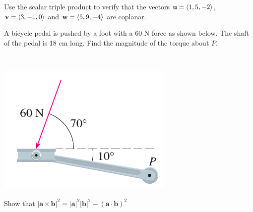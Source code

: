 \documentclass[notes]{subfiles}
\begin{document}
		\begin{ex}
			Use the scalar triple product to verify that the vectors $\textbf{u} = \left\langle 1,5,-2\right\rangle$, $\textbf{v} = \left\langle 3,-1,0\right\rangle$ and $\textbf{w} = \left\langle 5,9,-4\right\rangle$ are coplanar.
		\end{ex}
			\newpage
			
		\begin{ex}
			A bicycle pedal is pushed by a foot with a 60 N force as shown below.  The shaft of the pedal is 18 cm long.  Find the magnitude of the torque about $P$.
		\end{ex}\\
		\begin{flushleft}
			\includegraphics[scale = .75]{124_2.png}
		\end{flushleft}
			
		\begin{ex}
			Show that $|\textbf{a}\times \textbf{b}|^2 = |\textbf{a}|^2|\textbf{b}|^2 - (\textbf{a}\cdot\textbf{b})^2$
		\end{ex}
	
\clearpage
\end{document}
